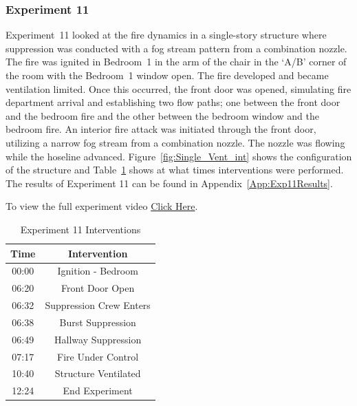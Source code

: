 \documentclass[12pt,oneside]{book}
\begin{document}
\subsubsection{Experiment 11}
Experiment~11 looked at the fire dynamics in a single-story structure where suppression was conducted with a fog stream pattern from a combination nozzle. The fire was ignited in Bedroom~1 in the arm of the chair in the `A/B' corner of the room with the Bedroom~1 window open. The fire developed and became ventilation limited. Once this occurred, the front door was opened, simulating fire department arrival and establishing two flow paths; one between the front door and the bedroom fire and the other between the bedroom window and the bedroom fire. An interior fire attack was initiated through the front door, utilizing a narrow fog stream from a combination nozzle. The nozzle was flowing while the hoseline advanced.  Figure~\ref{fig:Single_Vent_int} shows the configuration of the structure and Table~\ref{Table:Exp11Interventions} shows at what times interventions were performed. The results of Experiment 11 can be found in Appendix~\ref{App:Exp11Results}. 

To view the full experiment video \href{https://player.vimeo.com/video/170499614?autoplay=1}{Click Here}.

\begin{table}[H]
	\centering
	\caption{Experiment 11 Interventions}
	\begin{tabular}{|c|c|} 
		\hline
		Time & Intervention \\ \hline \hline
		00:00 & Ignition - Bedroom \\ \hline
		06:20 & Front Door Open \\ \hline
		06:32 & Suppression Crew Enters\\ \hline
		06:38 & Burst Suppression \\ \hline 
		06:49 & Hallway Suppression \\ \hline
		07:17 & Fire Under Control 	\\ \hline
		10:40 & Structure Ventilated \\ \hline
		12:24 & End Experiment\\ \hline
	\end{tabular}
	\label{Table:Exp11Interventions}
\end{table}

\FloatBarrier
\clearpage
\end{document}
